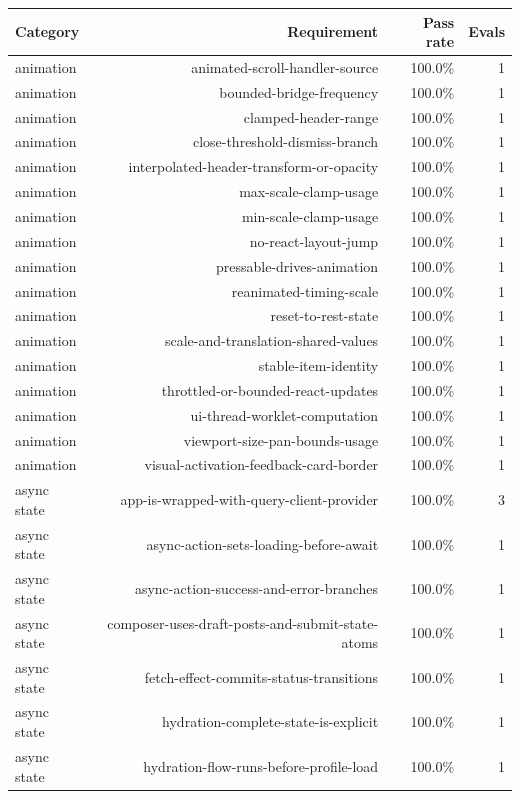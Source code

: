 \begin{table}[htbp]
\centering
\begin{tabular}{lrrr}
\toprule
Category & Requirement & Pass rate & Evals \\
\midrule
animation & animated-scroll-handler-source & 100.0\% & 1 \\
animation & bounded-bridge-frequency & 100.0\% & 1 \\
animation & clamped-header-range & 100.0\% & 1 \\
animation & close-threshold-dismiss-branch & 100.0\% & 1 \\
animation & interpolated-header-transform-or-opacity & 100.0\% & 1 \\
animation & max-scale-clamp-usage & 100.0\% & 1 \\
animation & min-scale-clamp-usage & 100.0\% & 1 \\
animation & no-react-layout-jump & 100.0\% & 1 \\
animation & pressable-drives-animation & 100.0\% & 1 \\
animation & reanimated-timing-scale & 100.0\% & 1 \\
animation & reset-to-rest-state & 100.0\% & 1 \\
animation & scale-and-translation-shared-values & 100.0\% & 1 \\
animation & stable-item-identity & 100.0\% & 1 \\
animation & throttled-or-bounded-react-updates & 100.0\% & 1 \\
animation & ui-thread-worklet-computation & 100.0\% & 1 \\
animation & viewport-size-pan-bounds-usage & 100.0\% & 1 \\
animation & visual-activation-feedback-card-border & 100.0\% & 1 \\
async state & app-is-wrapped-with-query-client-provider & 100.0\% & 3 \\
async state & async-action-sets-loading-before-await & 100.0\% & 1 \\
async state & async-action-success-and-error-branches & 100.0\% & 1 \\
async state & composer-uses-draft-posts-and-submit-state-atoms & 100.0\% & 1 \\
async state & fetch-effect-commits-status-transitions & 100.0\% & 1 \\
async state & hydration-complete-state-is-explicit & 100.0\% & 1 \\
async state & hydration-flow-runs-before-profile-load & 100.0\% & 1 \\

\end{tabular}
\end{table}
